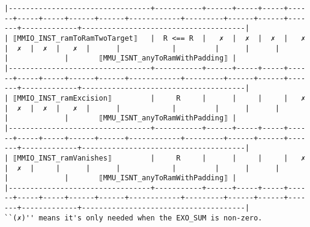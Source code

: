 \documentclass[varwidth=\maxdimen,margin=0.5cm,multi={verbatim}]{standalone}
\begin{document}
\begin{verbatim}
|---------------------------------+-----------+------+-----+-----+------+-----+-----+------+------+------------+---------+------+------+-------+-------------+--------------------------------------|
| ⟦MMIO_INST_ramToRamTwoTarget⟧   |  R <== R  |   ✗  |  ✗  |  ✗  |   ✗  |  ✗  |  ✗  |   ✗  |      |            |         |      |      |       |             |       ⟦MMU_ISNT_anyToRamWithPadding⟧ |
|---------------------------------+-----------+------+-----+-----+------+-----+-----+------+------+------------+---------+------+------+-------+-------------+--------------------------------------|
| ⟦MMIO_INST_ramExcision⟧         |     R     |      |     |     |   ✗  |  ✗  |  ✗  |   ✗  |      |            |         |      |      |       |             |       ⟦MMU_ISNT_anyToRamWithPadding⟧ |
|---------------------------------+-----------+------+-----+-----+------+-----+-----+------+------+------------+---------+------+------+-------+-------------+--------------------------------------|
| ⟦MMIO_INST_ramVanishes⟧         |     R     |      |     |     |   ✗  |  ✗  |     |      |      |            |         |      |      |       |             |       ⟦MMU_ISNT_anyToRamWithPadding⟧ |
|---------------------------------+-----------+------+-----+-----+------+-----+-----+------+------+------------+---------+------+------+-------+-------------+--------------------------------------|
``(✗)'' means it's only needed when the EXO_SUM is non-zero.

\end{verbatim}
\end{document}
